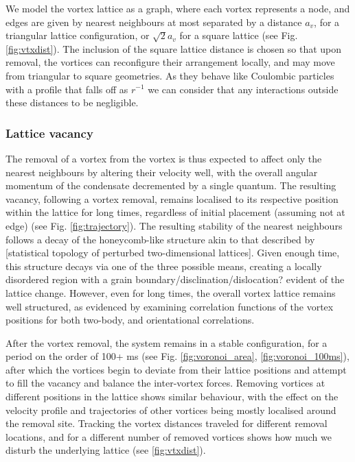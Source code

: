 We model the vortex lattice as a graph, where each vortex represents a node, and edges are given by nearest neighbours at most separated by
a distance $a_v$, for a triangular lattice configuration, or $\sqrt{2}a_v$ for a square lattice (see Fig. \ref{fig:vtxdist}). The inclusion
of the square lattice distance is chosen so that upon removal, the vortices can reconfigure their arrangement locally, and may move from
triangular to square geometries. As they behave like Coulombic particles with a profile that falls off as $r^{-1}$ we can consider that any
interactions outside these distances to be negligible.

\subsubsection{Lattice vacancy}
The removal of a vortex from the vortex is thus expected to affect only the nearest neighbours by altering their velocity well, with the
overall angular momentum of the condensate decremented by a single quantum. The resulting vacancy, following a vortex removal, remains
localised to its respective position within the lattice for long times, regardless of initial placement (assuming not at edge)
(see Fig. \ref{fig:trajectory}). The
resulting stability of the nearest neighbours follows a decay of the honeycomb-like structure akin to that described by [statistical
topology of perturbed two-dimensional lattices]. Given enough time, this structure decays via one of the three possible means, creating a
locally disordered region with a grain boundary/disclination/dislocation? evident of the lattice change. However, even for long times, the
overall vortex lattice remains well structured, as evidenced by examining correlation functions of the vortex positions for both two-body,
and orientational correlations.

After the vortex removal, the system remains in a stable configuration, for a period on the order of 100+ ms (see Fig. \ref{fig:voronoi_area},
\ref{fig:voronoi_100ms}), after which the vortices begin to deviate from their lattice positions and attempt to fill the vacancy and balance
the inter-vortex forces. Removing vortices at different positions in the lattice shows similar behaviour, with the effect on the velocity profile and trajectories of other vortices being mostly localised around the removal site. Tracking the vortex distances traveled for different removal locations, and for a different number of removed vortices shows how much we disturb the underlying lattice (see \ref{fig:vtxdist}).

